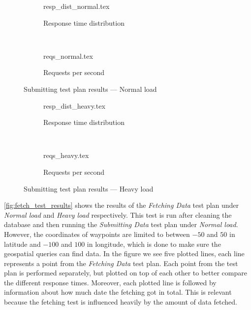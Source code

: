 \begin{figure}[!htb]
    \centering
    \begin{subfigure}[b]{\textwidth}
        \footnotesize
        \centering
        {resp_dist_normal.tex}
        \caption{Response time distribution}\label{fig:submit_resp_t_dist_normal}
    \end{subfigure}\\
    \begin{subfigure}[b]{\textwidth}
        \footnotesize
        \centering
        {reqs_normal.tex}
        \caption{Requests per second}\label{fig:submit_reqs_p_sec_normal}
    \end{subfigure}
    \caption{Submitting test plan results --- Normal load}\label{fig:submit_test_results_normal}
\end{figure}
\begin{figure}[!htb]
    \begin{subfigure}[b]{\textwidth}
        \footnotesize
        \centering
        {resp_dist_heavy.tex}
        \caption{Response time distribution}\label{fig:submit_resp_t_dist_heavy}
    \end{subfigure}\\
    \begin{subfigure}[b]{\textwidth}
        \footnotesize
        \centering
        {reqs_heavy.tex}
        \caption{Requests per second}\label{fig:submit_reqs_p_sec_heavy}
    \end{subfigure}
    \caption{Submitting test plan results --- Heavy load}\label{fig:submit_test_results_heavy}
\end{figure}

\bigskip
\cref{fig:fetch_test_results} shows the results of the \textit{Fetching Data} test plan under \textit{Normal load} and \textit{Heavy load} respectively.
This test is run after cleaning the database and then running the \textit{Submitting Data} test plan under \textit{Normal load}.
However, the coordinates of waypoints are limited to between $-50$ and $50$ in latitude and $-100$ and $100$ in longitude, which is done to make sure the geospatial queries can find data.
In the figure we see five plotted lines, each line represents a point from the \textit{Fetching Data} test plan.
Each point from the test plan is performed separately, but plotted on top of each other to better compare the different response times.
Moreover, each plotted line is followed by information about how much date the fetching got in total.
This is relevant because the fetching test is influenced heavily by the amount of data fetched.

